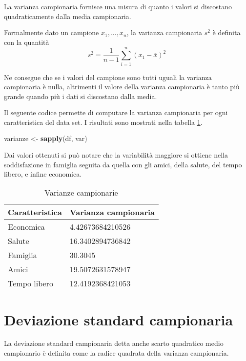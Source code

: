 \documentclass[]{book}
\newenvironment{Shaded}{\begin{snugshade}}{\end{snugshade}}
\newcommand{\KeywordTok}[1]{\textcolor[rgb]{0.13,0.29,0.53}{\textbf{#1}}}
\newcommand{\StringTok}[1]{\textcolor[rgb]{0.31,0.60,0.02}{#1}}
\newcommand{\NormalTok}[1]{#1}
\begin{document}
La varianza campionaria fornisce una misura di quanto i valori si
discostano quadraticamente dalla media campionaria.

Formalmente dato un campione \(x_1,...,x_n\), la varianza campionaria
\(s^2\) è definita con la quantità
\[s^2=\frac{1}{n-1} \sum_{i=1}^{n}(x_1-\overline{x})^2\]

Ne consegue che se i valori del campione sono tutti uguali la varianza
campionaria è nulla, altrimenti il valore della varianza campionaria è
tanto più grande quando più i dati si discostano dalla media.

Il seguente codice permette di computare la varianza campionaria per
ogni caratteristica del data set. I risultati sono mostrati nella
tabella \ref{tab:varianza-campionaria}.

\begin{Shaded}
\begin{Highlighting}[]
\NormalTok{varianze <-}\StringTok{ }\KeywordTok{sapply}\NormalTok{(df, var)}
\end{Highlighting}
\end{Shaded}

Dai valori ottenuti si può notare che la variabilità maggiore si ottiene
nella soddisfazione in famiglia seguita da quella con gli amici, della
salute, del tempo libero, e infine economica.

\begin{table}

\caption{\label{tab:varianza-campionaria}Varianze campionarie}
\centering
\begin{tabular}[t]{l|l}
\hline
Caratteristica & Varianza campionaria\\
\hline
Economica & 4.42673684210526\\
\hline
Salute & 16.3402894736842\\
\hline
Famiglia & 30.3045\\
\hline
Amici & 19.5072631578947\\
\hline
Tempo libero & 12.4192368421053\\
\hline
\end{tabular}
\end{table}

\section{Deviazione standard
campionaria}\label{deviazione-standard-campionaria}

La deviazione standard campionaria detta anche scarto quadratico medio
campionario è definita come la radice quadrata della varianza
campionaria.
\end{document}

